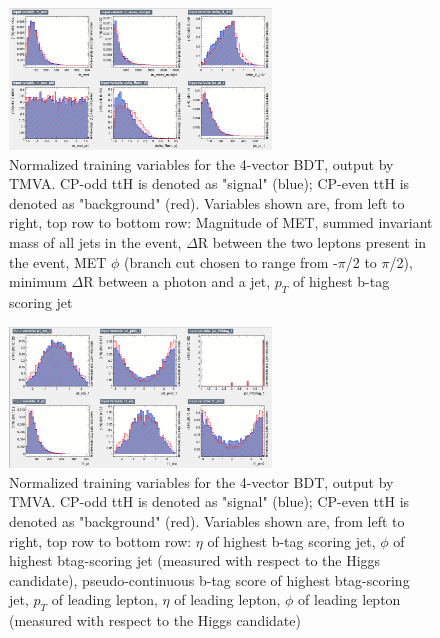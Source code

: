 \begin{figure}[htbp]
  \centering
  \includegraphics[width=0.62\textwidth]{figures/TMVABDTStudies/dilep-vbls4vec/dilep4vecvbls2.png}
  \caption{Normalized training variables for the 4-vector BDT, output by TMVA. CP-odd ttH is denoted as "signal" (blue); CP-even ttH is denoted as "background" (red). Variables shown are, from left to right, top row to bottom row: Magnitude of MET, summed invariant mass of all jets in the event, $\Delta$R between the two leptons present in the event, MET $\phi$ (branch cut chosen to range from -$\pi$/2 to $\pi$/2), minimum $\Delta$R between a photon and a jet, $p_{T}$ of highest b-tag scoring jet}
  \label{fig:dilep4vecvbls2}
\end{figure}

\begin{figure}[htbp]
  \centering
  \includegraphics[width=0.62\textwidth]{figures/TMVABDTStudies/dilep-vbls4vec/dilep4vecvbls3.png}
  \caption{Normalized training variables for the 4-vector BDT, output by TMVA. CP-odd ttH is denoted as "signal" (blue); CP-even ttH is denoted as "background" (red). Variables shown are, from left to right, top row to bottom row: $\eta$ of highest b-tag scoring jet, $\phi$ of highest btag-scoring jet (measured with respect to the Higgs candidate), pseudo-continuous b-tag score of highest btag-scoring jet,  $p_{T}$ of leading lepton, $\eta$ of leading lepton, $\phi$ of leading lepton (measured with respect to the Higgs candidate)}
  \label{fig:dilep4vecvbls3}
\end{figure}

